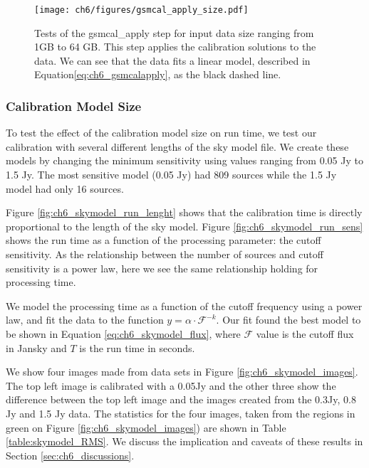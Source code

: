 \begin{figure}
\texttt{[image: ch6/figures/gsmcal\_apply\_size.pdf]}
        \caption{\small Tests of the {\selectfont gsmcal\_apply} step for input data size ranging from 1GB to 64 GB. This step applies the calibration solutions to the data. We can see that the data fits a linear model, described in Equation\ref{eq:ch6_gsmcalapply}, as the black dashed line.}
            \label{fig:ch6_gsmcalapply_size}
\end{figure}

\subsubsection{Calibration Model Size}
To test the effect of the calibration model size on run time, we test our calibration with several different lengths of the sky model file. We create these models by changing the minimum sensitivity using values ranging from 0.05 Jy to 1.5 Jy. The most sensitive model (0.05 Jy) had 809 sources while the 1.5 Jy model had only 16 sources. 

Figure \ref{fig:ch6_skymodel_run_lenght} shows that the calibration time is directly proportional to the length of the sky model. Figure \ref{fig:ch6_skymodel_run_sens} shows the run time as a function of the processing parameter: the cutoff sensitivity. As the relationship between the number of sources and cutoff sensitivity is a power law, here we see the same relationship holding for processing time.

We model the processing time as a function of the cutoff frequency using a power law, and fit the data to the function $y=\alpha\cdot \mathcal{F}^{-k}$. Our fit found the best model to be shown in Equation \ref{eq:ch6_skymodel_flux}, where $\mathcal{F}$ value is the cutoff flux in Jansky and $T$ is the run time in seconds. 

We show four images made from data sets in Figure \ref{fig:ch6_skymodel_images}. The top left image is calibrated with a 0.05Jy and the other three show the difference between the top left image and the images created from the 0.3Jy, 0.8 Jy and 1.5 Jy data. The statistics for the four images, taken from the regions in green on Figure \ref{fig:ch6_skymodel_images}) are shown in Table \ref{table:skymodel_RMS}. We discuss the implication and caveats of these results in Section \ref{sec:ch6_discussions}.


